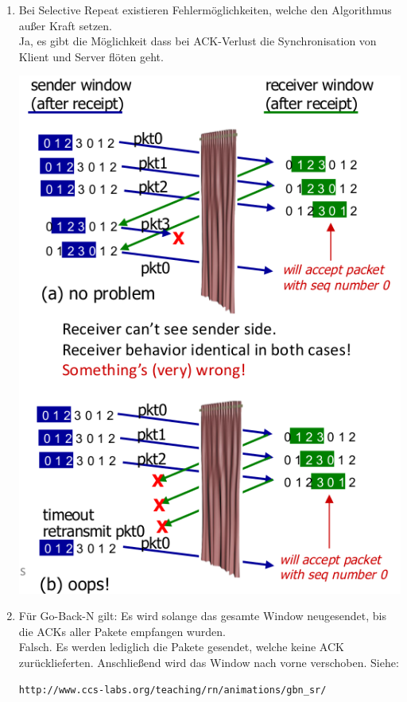 \documentclass{scrartcl}
\begin{document}
\begin{enumerate}
        \item Bei Selective Repeat existieren Fehlermöglichkeiten, welche den Algorithmus außer Kraft setzen.\\
        Ja, es gibt die Möglichkeit dass bei ACK-Verlust die Synchronisation von Klient und Server flöten geht.
        \begin{center}
            \includegraphics[width=\textwidth]{SelectiveRepeat_Error.png}
        \end{center}
        
        \item Für Go-Back-N gilt: Es wird solange das gesamte Window neugesendet, bis die ACKs aller Pakete empfangen wurden.\\
        Falsch. Es werden lediglich die Pakete gesendet, welche keine ACK zurücklieferten. Anschließend wird das Window nach vorne verschoben.
        Siehe: 
        \begin{verbatim}
http://www.ccs-labs.org/teaching/rn/animations/gbn_sr/
        \end{verbatim}
        

\end{enumerate}
\end{document}
